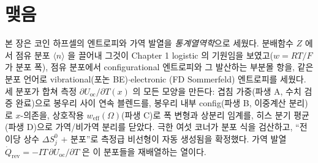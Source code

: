\documentclass[11pt,a4paper]{article}
\newcommand{\rev}{\mathrm{rev}}
\newcommand{\oc}{\mathrm{oc}}
\newcommand{\eff}{\mathrm{eff}}
\newcommand{\avg}[1]{\langle #1\rangle}
\begin{document}
\section*{맺음}
본 장은 코인 하프셀의 엔트로피와 가역 발열을 \emph{통계열역학}으로 세웠다. 분배함수 $Z$ 에서 점유 분포
$\avg{n}$ 을 끌어내 그것이 Chapter 1 logistic 의 기원임을 보였고($w=RT/F$ 가 분포 폭), 점유 분포에서
configurational 엔트로피와 그 발산하는 부분몰 항을, 같은 분포 언어로 vibrational(포논 BE)$\cdot$electronic
(FD Sommerfeld) 엔트로피를 세웠다. 세 분포가 합쳐 측정 $\partial U_\oc/\partial T(x)$ 의 모든 모양을 만든다:
겹침 가중(파생 A, 수치 검증 완료)으로 봉우리 사이 연속 블렌드를, 봉우리 내부 config(파생 B, 이중계산 분리)로
$x$-의존을, 상호작용 $w_\eff(\Omega)$(파생 C)로 폭 변형과 상분리 임계를, 히스 분기 평균(파생 D)으로 가역/비가역
분리를 닫았다. 극한 여섯 코너가 분포 식을 검산하고, ``전이당 상수 $\Delta S^0_j$ $+$ 분포''로 측정급 비선형이
자동 생성됨을 확정했다. 가역 발열 $\dot Q_\rev=-IT\,\partial U_\oc/\partial T$ 은 이 분포들을 재배열하는 열이다.
\end{document}
